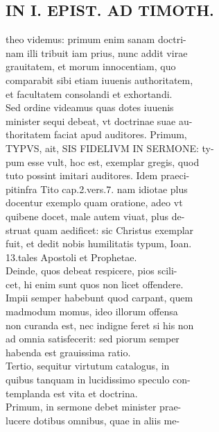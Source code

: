 \documentclass{article}
\begin{document}
\begin{pages}
\section*{IN I. EPIST. AD TIMOTH. \\
                }
theo videmus: primum enim sanam doctri- \\
                nam illi tribuit iam prius, nunc addit virae \\
                grauitatem, et morum innocentiam, quo \\
                comparabit sibi etiam iuuenis authoritatem, \\
                et facultatem consolandi et exhortandi. \\
                Sed ordine videamus quas dotes iuuenis \\
                minister sequi debeat, vt doctrinae suae au- \\
                thoritatem faciat apud auditores. Primum, \\
                TYPVS, ait, SIS FIDELIVM IN SERMONE: ty- \\
                pum esse vult, hoc est, exemplar gregis, quod \\
                tuto possint imitari auditores. Idem praeci- \\
                pitinfra Tito cap.2.vers.7. nam idiotae plus \\
                docentur exemplo quam oratione, adeo vt \\
                quibene docet, male autem viuat, plus de- \\
                struat quam aedificet: sic Christus exemplar \\
                fuit, et dedit nobis humilitatis typum, Ioan. \\
                13.tales Apostoli et Prophetae. \\
                Deinde, quos debeat respicere, pios scili- \\
                cet, hi enim sunt quos non licet offendere. \\
                Impii semper habebunt quod carpant, quem \\
                madmodum momus, ideo illorum offensa \\
                non curanda est, nec indigne feret si his non \\
                ad omnia satisfecerit: sed piorum semper \\
                habenda est grauissima ratio. \\
                Tertio, sequitur virtutum catalogus, in \\
                quibus tanquam in lucidissimo speculo con- \\
                templanda est vita et doctrina. \\
                Primum, in sermone debet minister prae- \\
                lucere dotibus omnibus, quae in aliis me- \\
                

\end{pages}
\end{document}
